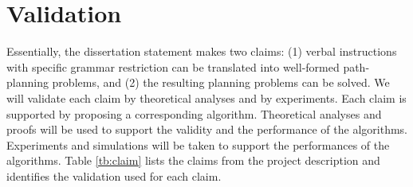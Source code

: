 \documentclass[phd]{byuprop}
\begin{document}
\section{Validation}
\label{sec:validation}

Essentially, the dissertation statement makes two claims:
(1) verbal instructions with specific grammar restriction can be translated into well-formed path-planning problems,
and (2) the resulting planning problems can be solved.
We will validate each claim by theoretical analyses and by experiments.
Each claim is supported by proposing a corresponding algorithm.
Theoretical analyses and proofs will be used to support the validity and the performance of the algorithms.
Experiments and simulations will be taken to support the performances of the algorithms.
Table \ref{tb:claim} lists the claims from the project description and identifies the validation used for each claim.
\end{document}

